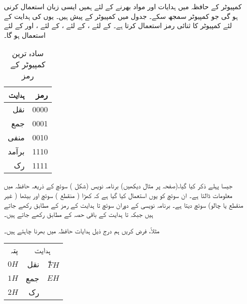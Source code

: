 کمپیوٹر کے  حافظہ میں ہدایات اور مواد بھرنے کے لئے ہمیں ایسی زبان استعمال کرنی ہو گی جو کمپیوٹر  سمجھ سکے۔ جدول   میں  کمپیوٹر  کے  پیش ہیں۔ یوں  کی ہدایت کے لئے کمپیوٹر  کا  ثنائی رمز استعمال کرتا ہے۔ کے لئے ،  کے لئے ، کے لئے ، اور  کے لئے  استعمال ہو گا۔ 
\begin{table}
\caption{سادہ ترین کمپیوٹر کے رمز}
\label{جدول_کمپیوٹر_رموز}
\centering
\begin{tabular}{rr}
\toprule
ہدایت&رمز\\
\midrule
نقل&0000\\
جمع&0001\\
منفی&0010\\
برآمد&1110\\
رک&1111\\
\bottomrule
\end{tabular}
\end{table}

\begin{figure}

\end{figure}

جیسا پہلے ذکر کیا گیا،(صفحہ  پر مثال  دیکھیں) برنامہ نویس (شکل )  سوئچ  کے ذریعہ  حافظہ میں معلومات ڈالتا ہے۔ ان سوئچ کو یوں استعمال کیا گیا ہے کہ کھڑا ( منقطع ) سوئچ  اور بیٹھا ( غیر منقطع   یا چالو) سوئچ  دیتا ہے۔ برنامہ نویسی کے دوران سوئچ  تا    ہدایت  کے رمز کے مطابق رکھے جاتے ہیں جبکہ  تا   ہدایت کے باقی حصہ کے مطابق رکھے جاتے ہیں۔

مثلاً،  فرض کریں ہم درج ذیل  ہدایات حافظہ میں بھرنا چاہتے ہیں۔
\begin{center}
\begin{tabular}{rrr}
پتہ&\multicolumn{2}{c}{ہدایت}\\[1ex]
$0H$& نقل& $ّFH$\\
$1H$&جمع& $EH$\\
$2H$&رک&
\end{tabular}
\end{center}

